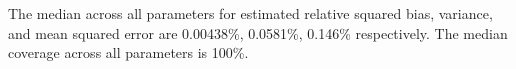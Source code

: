 The median across all parameters for  estimated relative squared bias, variance, and mean squared error are 0.00438\%, 0.0581\%, 0.146\% respectively. The median coverage across all parameters is 100\%.
